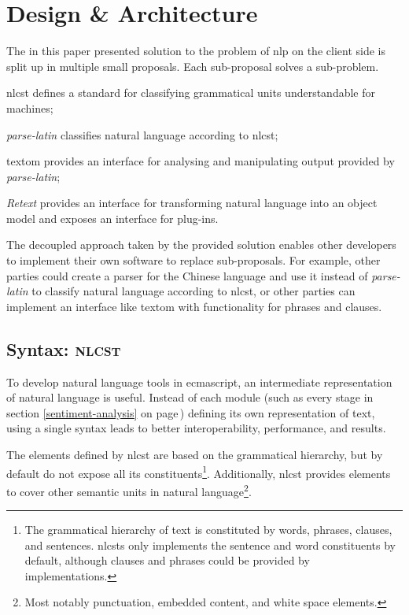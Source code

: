 \chapter{Design \& Architecture}\label{design}

The in this paper presented solution to the problem of \gls{nlp} on the
client side is split up in multiple small proposals. Each sub-proposal
solves a sub-problem.

\begin{aenumerate}
\item\acrshort{nlcst} defines a standard for classifying grammatical units
  understandable for machines;
\item\emph{parse-latin} classifies natural language according to
  \acrshort{nlcst};
\item\gls{textom} provides an interface for analysing and manipulating output
  provided by \emph{parse-latin};
\item\emph{Retext} provides an interface for transforming natural language
  into an object model and exposes an interface for plug-ins.
\end{aenumerate}

\noindent The decoupled approach taken by the provided solution enables other
  developers to implement their own software to replace sub-proposals.
For example, other parties could create a parser for the Chinese language and
  use it instead of \emph{parse-latin} to classify natural language according
  to \gls{nlcst}, or other parties can implement an interface like
  \gls{textom} with functionality for phrases and clauses.

\section{Syntax: \textsc{nlcst}}\label{syntax}

To develop natural language tools in \gls{ecmascript}, an intermediate
  representation of natural language is useful.
Instead of each module (such as every stage in section
  \ref{sentiment-analysis} on page\,\pageref{sentiment-analysis})
  defining its own representation of text, using a single syntax leads to
  better interoperability, performance, and results.

The elements defined by \acrfull{nlcst} are based on the grammatical
  hierarchy, but by default do not expose all its constituents\footnote{The
      grammatical hierarchy of text is constituted by words, phrases,
      clauses, and sentences.
    \glspl{nlcst} only implements the sentence and word constituents
    by default, although clauses and phrases could be provided by
    implementations.}.
Additionally, \gls{nlcst} provides elements to cover other semantic units in
  natural language\footnote{Most
    notably punctuation, embedded content, and white space elements.}.

